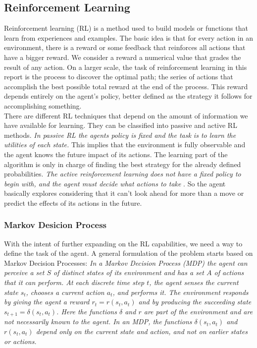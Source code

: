 \subsection*{Reinforcement Learning}

Reinforcement learning (RL) is a method used to build models or functions that learn from experiences and examples. The basic idea is that for every action in an environment, there is a reward or some feedback that reinforces all actions that have a bigger reward. We consider a reward a numerical value that grades the result of any action. On a larger scale, the task of reinforcement learning in this report is the process to discover the optimal path; the series of actions that accomplish the best possible total reward at the end of the process. This reward depends entirely on the agent's policy, better defined as the strategy it follows for accomplishing something. \\


There are different RL techniques that depend on the amount of information we have available for learning. They can be classified into passive and active RL methods. \textit{In passive RL the agents policy is fixed and the task is to learn the utilities of each state.} \cite[p764]{rl} This implies that the environment is fully observable and the agent knows the future impact of its actions. The learning part of the algorithm is only in charge of finding the best strategy for the already defined probabilities. \textit{The active reinforcement learning does not have a fixed policy to begin with, and the agent must decide what actions to take} \cite[p771]{rl}. So the agent basically explores considering that it can't look ahead for more than a move or predict the effects of its actions in the future.\\


\subsubsection{Markov Desicion Process} \label{mdp}

With the intent of further expanding on the RL capabilities, we need a way to define the task of the agent. A general formulation of the problem starts based on Markov Decision Processes: \textit{In a Markov Decision Process (MDP) the agent can perceive a set $S$ of distinct states of its environment and has a set $A$ of actions that it can perform. At each discrete time step $t$, the agent senses the current state $s_t$, chooses a current action $a_t$, and performs it. The environment responds by giving the agent a reward $r_t = r(s_t,a_t)$ and by producing the succeeding state $s_{t+1}= \delta (s_t,a_t)$. Here the functions $\delta$ and $r$ are part of the environment and are not necessarily known to the agent. In an MDP, the functions $\delta (s_t,a_t)$ and $r(s_t,a_t)$ depend only on the current state and action, and not on earlier states or actions.}\cite[p370]{ml_tom_mitchel} \\



